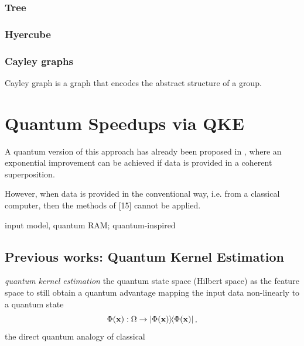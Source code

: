 \subsubsection{Tree}
\subsubsection{Hyercube}
\subsubsection{Cayley graphs}
\begin{definition}\label{def:cayley_graph}
	Cayley graph is a graph that encodes the abstract structure of a group. 
\end{definition}

\section{Quantum Speedups via QKE}\label{sec:speedup}
A quantum version of this approach has already been proposed in \cite{rebentrostQuantumSupportVector2014},
where an exponential improvement can be achieved if data is provided in a coherent superposition. 
\begin{remark}
	However, when data is provided in the conventional way, i.e. from a classical computer, then the methods of [15] cannot be applied.
\end{remark}
input model, quantum RAM;
quantum-inspired \cite{tangQuantuminspiredClassicalAlgorithm2019}

\subsection{Previous works: Quantum Kernel Estimation}\label{sec:qke}
\emph{quantum kernel estimation}
\cite{schuldQuantumMachineLearning2019}
\cite{havlicekSupervisedLearningQuantum2019}
the quantum state space (Hilbert space) as the feature space to still obtain a quantum advantage
mapping the input data non-linearly to a quantum state 
\begin{equation}
	\Phi(\vbx): \Omega \to \dyad{\Phi(\vbx)},
\end{equation}
the direct quantum analogy of classical 

